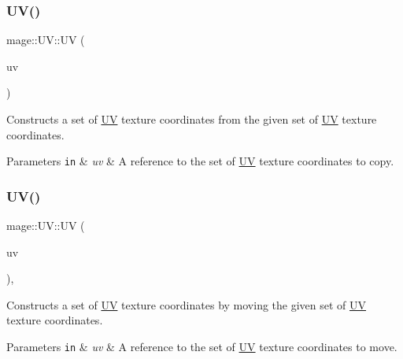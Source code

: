 \subsubsection{\texorpdfstring{U\+V()}{UV()}\hspace{0.1cm}{\footnotesize\ttfamily [3/6]}}
{\footnotesize\ttfamily mage\+::\+U\+V\+::\+UV (\begin{DoxyParamCaption}\item[{const \hyperlink{structmage_1_1_u_v}{UV} \&}]{uv }\end{DoxyParamCaption})\hspace{0.3cm}{\ttfamily [default]}}

Constructs a set of \hyperlink{structmage_1_1_u_v}{UV} texture coordinates from the given set of \hyperlink{structmage_1_1_u_v}{UV} texture coordinates.


\begin{DoxyParams}[1]{Parameters}
\mbox{\tt in}  & {\em uv} & A reference to the set of \hyperlink{structmage_1_1_u_v}{UV} texture coordinates to copy. \\
\hline
\end{DoxyParams}
\hypertarget{structmage_1_1_u_v_a47ad5c6b2fa30ef9a91bc875d71131b0}{}\label{structmage_1_1_u_v_a47ad5c6b2fa30ef9a91bc875d71131b0} 
\subsubsection{\texorpdfstring{U\+V()}{UV()}\hspace{0.1cm}{\footnotesize\ttfamily [4/6]}}
{\footnotesize\ttfamily mage\+::\+U\+V\+::\+UV (\begin{DoxyParamCaption}\item[{\hyperlink{structmage_1_1_u_v}{UV} \&\&}]{uv }\end{DoxyParamCaption})\hspace{0.3cm}{\ttfamily [default]}, {\ttfamily [noexcept]}}

Constructs a set of \hyperlink{structmage_1_1_u_v}{UV} texture coordinates by moving the given set of \hyperlink{structmage_1_1_u_v}{UV} texture coordinates.


\begin{DoxyParams}[1]{Parameters}
\mbox{\tt in}  & {\em uv} & A reference to the set of \hyperlink{structmage_1_1_u_v}{UV} texture coordinates to move. \\
\hline
\end{DoxyParams}
\hypertarget{structmage_1_1_u_v_a20ccaa4ee48cf6a9d072295f62461f7d}{}\label{structmage_1_1_u_v_a20ccaa4ee48cf6a9d072295f62461f7d} 
